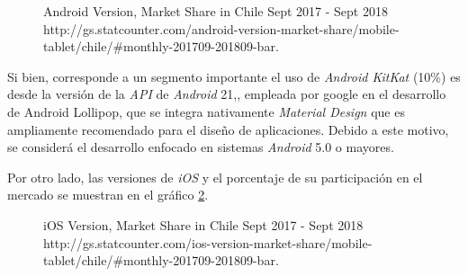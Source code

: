 \begin{figure}[H]
	\centering
	\caption[Android Version, Market Share in Chile Sept 2017 - Sept 2018.]{Android Version, Market Share in Chile Sept 2017 - Sept 2018 \\ http://gs.statcounter.com/android-version-market-share/mobile-tablet/chile/\#monthly-201709-201809-bar.}
	\label{chart:Android Version}
	\begin{bchart}[step=10, max=100, width=.7\textwidth, unit=\%]
	\end{bchart}
\end{figure}

Si bien, corresponde a un segmento importante el uso de \emph{Android KitKat} (10\%) es desde la versión de la \emph{API} de \emph{Android} 21,, empleada por google en el desarrollo de Android Lollipop, que se integra nativamente \emph{Material Design} que es ampliamente recomendado para el diseño de aplicaciones.  Debido a este motivo, se considerá el desarrollo enfocado en sistemas \emph{Android} 5.0 o mayores.

Por otro lado, las versiones de \emph{iOS} y el porcentaje de su participación en el mercado se muestran en el gráfico \ref{chart:iOS Version}.

\begin{figure}[H]
	\centering
	\caption[iOS Version, Market Share in Chile Sept 2017 - Sept 2018.]{iOS Version, Market Share in Chile Sept 2017 - Sept 2018 \\ http://gs.statcounter.com/ios-version-market-share/mobile-tablet/chile/\#monthly-201709-201809-bar.}
	\label{chart:iOS Version}
	\begin{bchart}[step=10, max=100, width=.8\textwidth, unit=\%]
	\end{bchart}
\end{figure}

